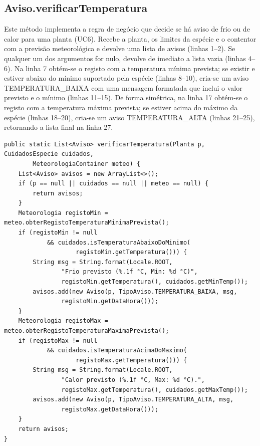 \documentclass[runningheads,a4paper]{llncs}
\begin{document}
\subsection{Aviso.verificarTemperatura}
Este método implementa a regra de negócio que decide se há aviso de frio ou de
calor para uma planta (UC6). Recebe a planta, os limites da espécie e o contentor
com a previsão meteorológica e devolve uma lista de avisos (linhas 1--2). Se qualquer
um dos argumentos for nulo, devolve de imediato a lista vazia (linhas 4--6). Na linha 7
obtém-se o registo com a temperatura mínima prevista; se existir e estiver abaixo
do mínimo suportado pela espécie (linhas 8--10), cria-se um aviso
TEMPERATURA\_BAIXA com uma mensagem formatada que inclui o valor previsto e o
mínimo (linhas 11--15). De forma simétrica, na linha 17 obtém-se o registo com a
temperatura máxima prevista; se estiver acima do máximo da espécie (linhas
18--20), cria-se um aviso TEMPERATURA\_ALTA (linhas 21--25), retornando a lista
final na linha 27.

\begin{lstlisting}[caption={Aviso.verificarTemperatura},label=lst:verifTemp]
public static List<Aviso> verificarTemperatura(Planta p, CuidadosEspecie cuidados,
        MeteorologiaContainer meteo) {
    List<Aviso> avisos = new ArrayList<>();
    if (p == null || cuidados == null || meteo == null) {
        return avisos;
    }
    Meteorologia registoMin = meteo.obterRegistoTemperaturaMinimaPrevista();
    if (registoMin != null
            && cuidados.isTemperaturaAbaixoDoMinimo(
                    registoMin.getTemperatura())) {
        String msg = String.format(Locale.ROOT,
                "Frio previsto (%.1f °C, Min: %d °C)",
                registoMin.getTemperatura(), cuidados.getMinTemp());
        avisos.add(new Aviso(p, TipoAviso.TEMPERATURA_BAIXA, msg,
                registoMin.getDataHora()));
    }
    Meteorologia registoMax = meteo.obterRegistoTemperaturaMaximaPrevista();
    if (registoMax != null
            && cuidados.isTemperaturaAcimaDoMaximo(
                    registoMax.getTemperatura())) {
        String msg = String.format(Locale.ROOT,
                "Calor previsto (%.1f °C, Max: %d °C).",
                registoMax.getTemperatura(), cuidados.getMaxTemp());
        avisos.add(new Aviso(p, TipoAviso.TEMPERATURA_ALTA, msg,
                registoMax.getDataHora()));
    }
    return avisos;
}
\end{lstlisting}

\end{document}
